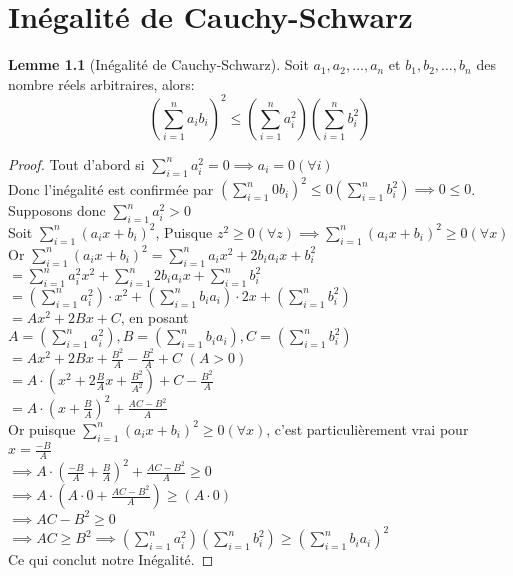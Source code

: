 \documentclass[12pt]{book}
\def\sep{\phantom{}}
\theoremstyle{definition}
\newtheorem{lemma}[theorem]{Lemme}
\begin{document}
\chapter{Inégalité de Cauchy-Schwarz}
\begin{lemma}[Inégalité de Cauchy-Schwarz]
    Soit $a_1,a_2,\dots,a_n$ et $b_1,b_2,\dots,b_n$ des nombre réels arbitraires, alors:
    $$ (\sum_{i=1}^{n}a_ib_i)^2 \leq (\sum_{i=1}^{n}a_i^2)(\sum_{i=1}^{n}b_i^2) $$   
\end{lemma}

\begin{proof}
    Tout d'abord si $\sum_{i=1}^{n}a_i^2 = 0 \implies a_i = 0(\forall i)$ \sep \\
    Donc l'inégalité est confirmée par $ (\sum_{i=1}^{n}0b_i)^2 \leq 0(\sum_{i=1}^{n}b_i^2) \implies 0 \leq 0$. \sep \\
    Supposons donc $\sum_{i=1}^{n}a_i^2 > 0$ \sep \\
    Soit $\sum_{i=1}^{n} (a_ix + b_i)^2$, Puisque $z^2 \geq 0(\forall z) \implies \sum_{i=1}^{n} (a_ix + b_i)^2 \geq 0 (\forall x)$ \sep \\
    Or $\sum_{i=1}^{n} (a_ix + b_i)^2 = \sum_{i=1}^{n} a_ix^2 + 2b_ia_ix + b_i^2$ \sep \\
    $= \sum_{i=1}^{n} a_i^2x^2 + \sum_{i=1}^{n} 2b_ia_ix + \sum_{i=1}^{n} b_i^2$ \sep \\
    $= (\sum_{i=1}^{n} a_i^2) \cdot x^2 + (\sum_{i=1}^{n} b_ia_i) \cdot 2x + (\sum_{i=1}^{n} b_i^2)$ \sep \\
    $= Ax^2 + 2Bx + C$, en posant $A = (\sum_{i=1}^{n} a_i^2), B = (\sum_{i=1}^{n} b_ia_i), C = (\sum_{i=1}^{n} b_i^2)$ \sep \\
    $=Ax^2 + 2Bx + \frac{B^2}{A} - \frac{B^2}{A} + C$ $(A > 0)$ \sep \\
    $=A \cdot (x^2 + 2\frac{B}{A}x + \frac{B^2}{A^2}) + C - \frac{B^2}{A}$ \sep \\
    $=A \cdot (x + \frac{B}{A})^2 + \frac{AC - B^2}{A}$ \sep \\
    Or puisque $\sum_{i=1}^{n} (a_ix + b_i)^2 \geq 0 (\forall x)$, c'est particulièrement vrai pour $x = \frac{-B}{A}$ \sep \\
    $\implies A \cdot (\frac{-B}{A} + \frac{B}{A})^2 + \frac{AC - B^2}{A} \geq 0$ \sep \\
    $\implies A \cdot (A \cdot 0 + \frac{AC - B^2}{A}) \geq (A \cdot 0)$ \sep \\
    $\implies AC - B^2 \geq 0$ \sep \\
    $\implies AC \geq B^2 \implies (\sum_{i=1}^{n} a_i^2)(\sum_{i=1}^{n} b_i^2) \geq (\sum_{i=1}^{n} b_ia_i)^2$ \sep \\
    Ce qui conclut notre Inégalité.
\end{proof}
\end{document}
